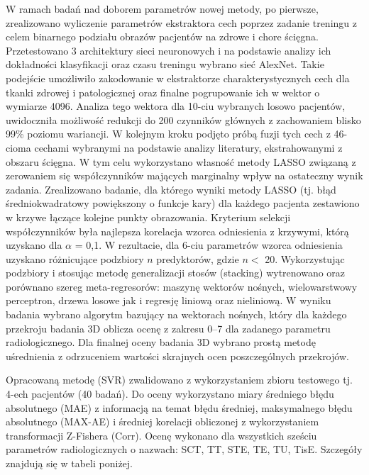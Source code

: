 W ramach badań nad doborem parametrów nowej metody, po pierwsze, zrealizowano wyliczenie parametrów ekstraktora cech poprzez zadanie treningu z celem binarnego podziału obrazów pacjentów na zdrowe i chore ścięgna. Przetestowano 3 architektury sieci neuronowych i na podstawie analizy ich dokładności klasyfikacji oraz czasu treningu wybrano sieć AlexNet. Takie podejście umożliwiło zakodowanie w ekstraktorze charakterystycznych cech dla tkanki zdrowej i patologicznej oraz finalne pogrupowanie ich w wektor o wymiarze 4096. Analiza tego wektora dla 10-ciu wybranych losowo pacjentów, uwidoczniła możliwość redukcji do 200 czynników głównych z zachowaniem blisko 99\% poziomu wariancji. W kolejnym kroku podjęto próbą fuzji tych cech z 46-cioma cechami wybranymi na podstawie analizy literatury, ekstrahowanymi z obszaru ścięgna. W tym celu wykorzystano własność metody LASSO związaną z zerowaniem się współczynników mających marginalny wpływ na ostateczny wynik zadania. Zrealizowano badanie, dla którego wyniki metody LASSO (tj. błąd średniokwadratowy powiększony o funkcje kary) dla każdego pacjenta zestawiono w krzywe łączące kolejne punkty obrazowania. Kryterium selekcji współczynników była najlepsza korelacja wzorca odniesienia z krzywymi, którą uzyskano dla $\alpha$ = 0,1. W rezultacie, dla 6-ciu parametrów wzorca odniesienia uzyskano różnicujące podzbiory $n$ predyktorów, gdzie $n<$ 20. Wykorzystując podzbiory i stosując metodę generalizacji stosów (stacking) wytrenowano oraz porównano szereg meta-regresorów: maszynę wektorów nośnych, wielowarstwowy perceptron, drzewa losowe jak i regresję liniową oraz nieliniową. W wyniku badania wybrano algorytm bazujący na wektorach nośnych, który dla każdego przekroju badania 3D oblicza ocenę z zakresu 0--7 dla zadanego parametru radiologicznego. Dla finalnej oceny badania 3D wybrano prostą metodę uśrednienia z odrzuceniem wartości skrajnych ocen poszczególnych przekrojów. 

Opracowaną metodę (SVR) zwalidowano z wykorzystaniem zbioru testowego tj. 4-ech pacjentów (40 badań). Do oceny wykorzystano miary średniego błędu absolutnego (MAE) z informacją na temat błędu średniej, maksymalnego błędu absolutnego (MAX-AE) i średniej korelacji obliczonej z wykorzystaniem transformacji Z-Fishera (Corr). Ocenę wykonano dla wszystkich sześciu parametrów radiologicznych o nazwach: SCT, TT, STE, TE, TU, TisE. Szczegóły znajdują się w tabeli poniżej.

